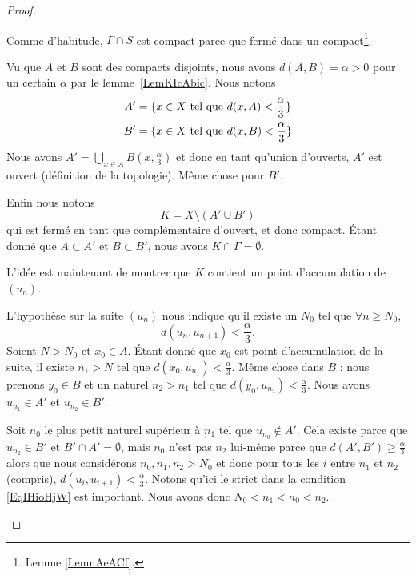 \begin{proof}
\begin{subproof}
        Comme d'habitude, \( \Gamma\cap S\) est compact parce que fermé dans un compact\footnote{Lemme \ref{LemnAeACf}.}.

    \item[Décomposition en trois morceaux]

        Vu que \( A\) et \( B\) sont des compacts disjoints, nous avons \( d(A,B)=\alpha>0\) pour un certain \( \alpha\) par le lemme~\ref{LemKIcAbic}. Nous notons
        \begin{subequations}
            \begin{align}
                A'&=\{x\in X\text{ tel que } d(x,A)<\frac{ \alpha }{ 3 }\}\\
                B'&=\{x\in X\text{ tel que } d(x,B)<\frac{ \alpha }{ 3 }\}
            \end{align}
        \end{subequations}
        Nous avons \( A'=\bigcup_{x\in A}B(x,\frac{ \alpha }{ 3 })\) et donc en tant qu'union d'ouverts, \( A'\) est ouvert (définition de la topologie). Même chose pour \( B'\).

        Enfin nous notons
        \begin{equation}
            K=X\setminus(A'\cup B')
        \end{equation}
        qui est fermé en tant que complémentaire d'ouvert, et donc compact. Étant donné que \( A\subset A'\) et \( B\subset B' \), nous avons \( K\cap \Gamma=\emptyset\).

        L'idée est maintenant de montrer que \( K\) contient un point d'accumulation de \( (u_n)\).

    \item[Sous-suites de \( (u_n)\)]

        L'hypothèse sur la suite \( (u_n)\) nous indique qu'il existe un \( N_0\) tel que \( \forall n\geq N_0\),
        \begin{equation}    \label{EqIHioHjW}
            d(u_{n},u_{n+1})<\frac{ \alpha }{ 3 }.
        \end{equation}
        Soient \( N>N_0 \) et \( x_0\in A\). Étant donné que \( x_0\) est point d'accumulation de la suite, il existe \( n_1>N\) tel que \( d(x_0,u_{n_1})<\frac{ \alpha }{ 3 }\). Même chose dans \( B\) : nous prenons \( y_0\in B\) et un naturel \( n_2>n_1\) tel que \( d(y_0,u_{n_2})<\frac{ \alpha }{ 3 }\). Nous avons \( u_{n_1}\in A'\) et \( u_{n_2}\in B'\).

        Soit \( n_0\) le plus petit naturel supérieur à \( n_1\) tel que \( u_{n_0}\notin A'\). Cela existe parce que \( u_{n_2}\in B'\) et \( B'\cap A'=\emptyset\), mais \( n_0\) n'est pas \( n_2\) lui-même parce que \( d(A',B')\geq \frac{ \alpha }{ 3 }\) alors que nous considérons \( n_0,n_1,n_2>N_0\) et donc pour tous les \( i\) entre \( n_1\) et \( n_2\) (compris), \( d(u_i,u_{i+1})<\frac{ \alpha }{ 3 }\). Notons qu'ici le strict dans la condition \eqref{EqIHioHjW} est important. Nous avons donc \(N_0<n_1<n_0<n_2\).


\end{subproof}
\end{proof}
